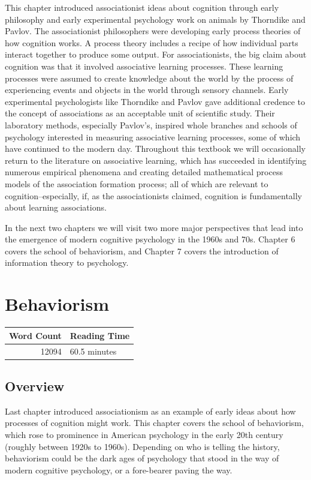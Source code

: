 \documentclass[
  oneside,
  12pt]{crumpbook}
\begin{document}
This chapter introduced associationist ideas about cognition through early philosophy and early experimental psychology work on animals by Thorndike and Pavlov. The associationist philosophers were developing early process theories of how cognition works. A process theory includes a recipe of how individual parts interact together to produce some output. For associationists, the big claim about cognition was that it involved associative learning processes. These learning processes were assumed to create knowledge about the world by the process of experiencing events and objects in the world through sensory channels. Early experimental psychologists like Thorndike and Pavlov gave additional credence to the concept of associations as an acceptable unit of scientific study. Their laboratory methods, especially Pavlov's, inspired whole branches and schools of psychology interested in measuring associative learning processes, some of which have continued to the modern day. Throughout this textbook we will occasionally return to the literature on associative learning, which has succeeded in identifying numerous empirical phenomena and creating detailed mathematical process models of the association formation process; all of which are relevant to cognition--especially, if, as the associationists claimed, cognition is fundamentally about learning associations.

In the next two chapters we will visit two more major perspectives that lead into the emergence of modern cognitive psychology in the 1960s and 70s. Chapter 6 covers the school of behaviorism, and Chapter 7 covers the introduction of information theory to psychology.

\hypertarget{behaviorism}{%
\chapter{Behaviorism}\label{behaviorism}}

\begin{tabular}{r|l}
\hline
Word Count & Reading Time\\
\hline
12094 & 60.5 minutes\\
\hline
\end{tabular}

\hypertarget{overview}{%
\section{Overview}\label{overview}}

Last chapter introduced associationism as an example of early ideas about how processes of cognition might work. This chapter covers the school of behaviorism, which rose to prominence in American psychology in the early 20th century (roughly between 1920s to 1960s). Depending on who is telling the history, behaviorism could be the dark ages of psychology that stood in the way of modern cognitive psychology, or a fore-bearer paving the way.
\end{document}
